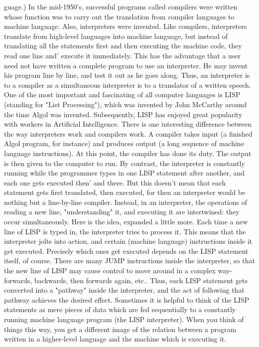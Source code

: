        guage.) In the mid-1950's, successful programs called compilers were written
       whose function was to carry out the translation from compiler languages to
       machine language.
                Also, interpreters were invented. Like compilers, interpreters translate
       from high-level languages into machine language, but instead of translating all the
       statements first and then executing the machine code, they read one line and'
       execute it immediately. This has the advantage that a user need not have written a
       complete program to use an interpreter. He may invent his program line by line,
       and test it out as he goes along. Thus, an interpreter is to a compiler as a
       simultaneous interpreter is to a translator of a written speech. One of the most
       important and fascinating of all computer languages is LISP (standing for "List
       Processing"), which was invented by John McCarthy around the time Algol was
       invented. Subsequently, LISP has enjoyed great popularity with workers in
       Artificial Intelligence.
                There is one interesting difference between the way interpreters work and
       compilers work. A compiler takes input (a finished Algol program, for instance)
       and produces output (a long sequence of machine language instructions). At this
       point, the compiler has done its duty. The output is then given to the computer to
       run. By contrast, the interpreter is constantly running while the programmer types
       in one LISP statement after another, and each one gets executed then' and there.
       But this doesn't mean that each statement gets first translated, then executed, for
       then an interpreter would be nothing but a line-by-line compiler. Instead, in an
       interpreter, the operations of reading a new line, "understanding" it, and executing
       it are intertwined: they occur simultaneously.
                Here is the idea, expanded a little more. Each time a new line of LISP is
       typed in, the interpreter tries to process it. This means that the interpreter jolts into
       action, and certain (machine language) instructions inside it get executed.
       Precisely which ones get executed depends on the LISP statement itself, of
       course. There are many JUMP instructions inside the interpreter, so that the new
       line of LISP may cause control to move around in a complex way-forwards,
       backwards, then forwards again, etc.. Thus, each LISP statement gets converted
       into a "pathway" inside the interpreter, and the act of following that pathway
       achieves the desired effect.
                Sometimes it is helpful to think of the LISP statements as mere pieces of
       data which are fed sequentially to a constantly running machine language
       program (the LISP interpreter). When you think of things this way, you get a
       different image of the relation between a program written in a higher-level
       language and the machine which is executing it.

